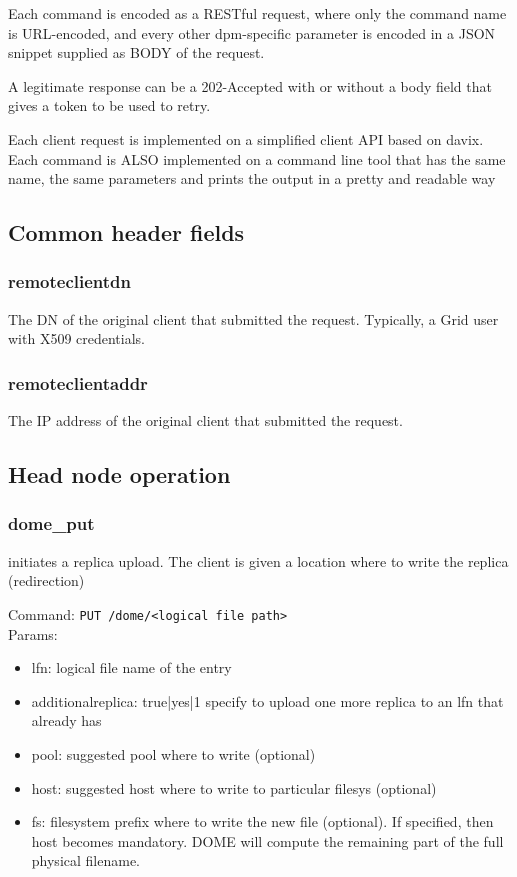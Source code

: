 \documentclass[a4paper,10pt]{scrreprt}
\begin{document}
Each command is encoded as a RESTful request, where only the command name is URL-encoded, and every other dpm-specific parameter is encoded in a JSON snippet supplied as BODY of the request.

A legitimate response can be a 202-Accepted with or without a body field that gives a token to be used to retry.

Each client request is implemented on a simplified client API based on davix.
Each command is ALSO implemented on a command line tool that has the same name, the same parameters and prints the output in a pretty and readable way\\

\subsection{Common header fields}


\subsubsection{remoteclientdn}
The DN of the original client that submitted the request. Typically, a Grid user with X509 credentials.\\

\subsubsection{remoteclientaddr}
The IP address of the original client that submitted the request.


\subsection{Head node operation}

\subsubsection{dome\_put}
initiates a replica upload. The client is given a location where to write the replica (redirection)

Command:
\lstinline"PUT /dome/<logical file path>"\\
Params:
\begin{itemize}
 \item lfn: logical file name of the entry
 \item additionalreplica: true|yes|1   specify to upload one more replica to an lfn that already has
 \item pool: suggested pool where to write (optional)
 \item host: suggested host where to write to particular filesys (optional)
 \item fs: filesystem prefix where to write the new file (optional). If specified, then host becomes mandatory. DOME will compute the remaining part of the full physical filename.
\end{itemize}
\end{document}
